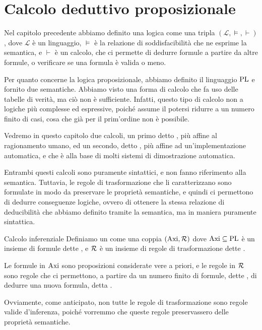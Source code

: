 \chapter{Calcolo deduttivo proposizionale}

Nel capitolo precedente abbiamo definito una logica come una tripla \((\mathcal{L}, \models, \vdash)\), dove \(\mathcal{L}\) è un linguaggio, \(\models\) è la relazione di soddisfacibilità che ne esprime la semantica, e \(\vdash\) è un calcolo, che ci permette di dedurre formule a partire da altre formule, o verificare se una formula è valida o meno.

Per quanto concerne la logica proposizionale, abbiamo definito il linguaggio \(\operatorname{PL}\) e fornito due semantiche. 
Abbiamo visto una forma di calcolo che fa uso delle tabelle di verità, ma ciò non è sufficiente.
Infatti, questo tipo di calcolo non  a logiche più complesse ed espressive, poiché assume il potersi ridurre a un numero finito di casi, cosa che già per il prim'ordine non è possibile.

Vedremo in questo capitolo due calcoli, un primo detto , più affine al ragionamento umano, ed un secondo, detto , più affine ad un'implementazione automatica, e che è alla base di molti sistemi di dimostrazione automatica.

Entrambi questi calcoli sono puramente sintattici, e non fanno riferimento alla semantica. 
Tuttavia, le regole di trasformazione che li caratterizzano sono formulate in modo da preservare le proprietà semantiche, e quindi ci permettono di dedurre conseguenze logiche, ovvero di ottenere la stessa relazione di deducibilità che abbiamo definito tramite la semantica, ma in maniera puramente sintattica.

\begin{definition}{Calcolo inferenziale}
  Definiamo un  come una coppia \((\operatorname{Axi}, \mathcal{R})\) dove \(\operatorname{Axi} \subseteq \operatorname{PL}\) è un insieme di formule dette , e \(\mathcal{R}\) è un insieme di regole di trasformazione dette .

  Le formule in \(\operatorname{Axi}\) sono proposizioni considerate vere a priori, e le regole in \(\mathcal{R}\) sono regole che ci permettono, a partire da un numero finito di formule, dette , di dedurre una nuova formula, detta .
\end{definition}

Ovviamente, come anticipato, non tutte le regole di trasformazione sono regole valide d'inferenza, poiché vorremmo che queste regole preservassero delle proprietà semantiche.

